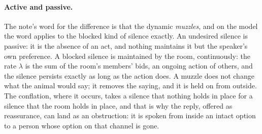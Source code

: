 
\paragraph{Active and passive.} The note's word for the difference is that the dynamic \emph{muzzles}, and on the model the word applies to the blocked kind of silence exactly. An undesired silence is passive: it is the absence of an act, and nothing maintains it but the speaker's own preference. A blocked silence is maintained by the room, continuously: the rate $\lambda$ is the sum of the room's members' bids, an ongoing action of others, and the silence persists exactly as long as the action does. A muzzle does not change what the animal would say; it removes the saying, and it is held on from outside. The conflation, where it occurs, takes a silence that nothing holds in place for a silence that the room holds in place, and that is why the reply, offered as reassurance, can land as an obstruction: it is spoken from inside an intact option to a person whose option on that channel is gone.

